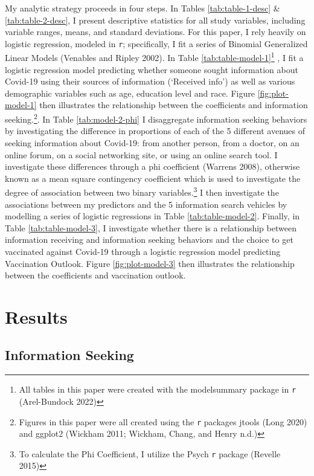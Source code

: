 My analytic strategy proceeds in four steps. In Tables \ref{tab:table-1-desc}
\& \ref{tab:table-2-desc}, I present descriptive statistics for all study
variables, including variable ranges, means, and standard deviations. For this
paper, I rely heavily on logistic regression, modeled in \texttt{r}; specifically, I
fit a series of Binomial Generalized Linear Models (Venables and Ripley 2002). In Table \ref{tab:table-model-1}\footnote{All tables in this paper were created with the modelsummary package in \texttt{r} (Arel-Bundock 2022)}
, I fit a logistic regression model predicting
whether someone sought information about Covid-19 using their sources of
information (`Received info') as well as various demographic variables such as
age, education level and race. Figure \ref{fig:plot-model-1} then illustrates
the relationship between the coefficients and information seeking.\footnote{Figures in
  this paper were all created using the \texttt{r} packages jtools (Long 2020) and ggplot2 (Wickham 2011; Wickham, Chang, and Henry n.d.)}.
In Table \ref{tab:model-2-phi} I disaggregate information seeking behaviors by
investigating the difference in proportions of each of the 5 different avenues
of seeking information about Covid-19: from another person, from a doctor, on an
online forum, on a social networking site, or using an online search tool. I
investigate these differences through a phi coefficient (Warrens 2008), otherwise
known as a mean square contingency coefficient which is used to investigate the
degree of association between two binary variables.\footnote{To calculate the Phi
  Coefficient, I utilize the Psych \texttt{r} package (Revelle 2015)} I then investigate the
associations between my predictors and the 5 information search vehicles by
modelling a series of logistic regressions in Table \ref{tab:table-model-2}.
Finally, in Table \ref{tab:table-model-3}, I investigate whether there is a
relationship between information receiving and information seeking behaviors and
the choice to get vaccinated against Covid-19 through a logistic regression
model predicting Vaccination Outlook. Figure \ref{fig:plot-model-3} then
illustrates the relationship between the coefficients and vaccination outlook.

\hypertarget{results}{%
\section{Results}\label{results}}

\hypertarget{information-seeking}{%
\subsection{Information Seeking}\label{information-seeking}}

